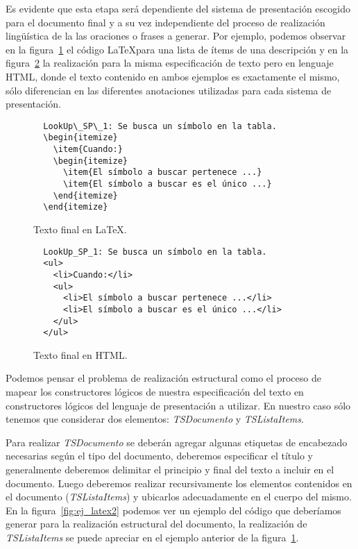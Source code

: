 Es evidente que esta etapa será dependiente del sistema de presentación escogido para el documento final y a su vez independiente del proceso de realización lingüística de la las oraciones o frases a generar.  Por ejemplo, podemos observar en la figura~\ref{fig:ej_latex} el código \LaTeX para una lista de ítems de una descripción y en la figura~\ref{fig:ej_html} la realización para la misma especificación de texto pero en lenguaje HTML, donde el texto contenido en ambos ejemplos es exactamente el mismo, sólo diferencian en las diferentes anotaciones utilizadas para cada sistema de presentación.

\begin{figure}[H]
  \begin{verbatim}
  LookUp\_SP\_1: Se busca un símbolo en la tabla.  
  \begin{itemize}
    \item{Cuando:}
    \begin{itemize}
      \item{El símbolo a buscar pertenece ...}
      \item{El símbolo a buscar es el único ...}   
    \end{itemize}
  \end{itemize}
  \end{verbatim}
  \caption{Texto final en \LaTeX.}
  \label{fig:ej_latex}
\end{figure}

\begin{figure}[H]
  \begin{verbatim}
  LookUp_SP_1: Se busca un símbolo en la tabla.  
  <ul>
    <li>Cuando:</li>
    <ul>
      <li>El símbolo a buscar pertenece ...</li>
      <li>El símbolo a buscar es el único ...</li>
    </ul>
  </ul>
  \end{verbatim}
  \caption{Texto final en HTML.}
  \label{fig:ej_html}
\end{figure}

Podemos pensar el problema de realización estructural como el proceso de mapear los constructores lógicos de nuestra especificación del texto en constructores lógicos del lenguaje de presentación a utilizar. En nuestro caso sólo tenemos que considerar dos elementos: \emph{TSDocumento} y \emph{TSListaItems}.

Para realizar \emph{TSDocumento} se deberán agregar algunas etiquetas de encabezado necesarias según el tipo del documento, deberemos especificar el título y generalmente deberemos delimitar el principio y final del texto a incluir en el documento. Luego deberemos realizar recursivamente los elementos contenidos en el documento (\emph{TSListaItems}) y ubicarlos adecuadamente en el cuerpo del mismo. En la figura~\ref{fig:ej_latex2} podemos ver un ejemplo del código que deberíamos generar para la realización estructural del documento, la realización de \emph{TSListaItems} se puede apreciar en el ejemplo anterior de la figura~\ref{fig:ej_latex}.

